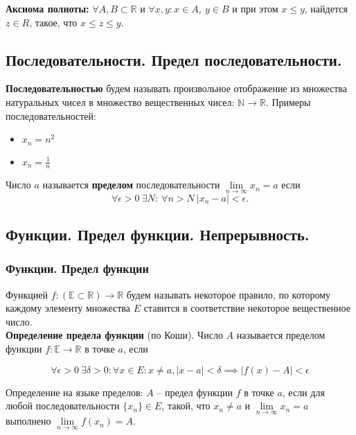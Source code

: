 \documentclass{article}
\begin{document}
\textbf{Аксиома полноты:} $\forall A, B \subset \mathbb{R}$ и $\forall x,y: x \in A, \ y \in B$ и при этом $x \le y$, найдется $z \in R$, такое, что $x \le z \le y$.

\subsection{Последовательности. Предел последовательности.}

\textbf{Последовательностью} будем называть произвольное отображение из множества натуральных чисел в множество вещественных чисел: $\mathbb{N} \to \mathbb{R}$. Примеры последовательностей:

\begin{itemize}
	\item $x_n = n^2$
	\item $x_n = \frac{1}{n}$
\end{itemize}

Число $a$ называется \textbf{пределом} последовательности $\lim\limits_{n \to \infty} x_n = a$ если $$ \forall \epsilon > 0 \ \exists N :  \ \forall n > N \ |x_n - a| < \epsilon.$$

\subsection{Функции. Предел функции. Непрерывность.}

\subsubsection{Функции. Предел функции}

Функцией $f : \left(\mathbb{E} \subset \mathbb{R}\right) \to \mathbb{R}$ будем называть некоторое правило, по которому каждому элементу множества $E$ ставится в соответствие некоторое вещественное число. \\

\textbf{Определение предела функции} (по Коши). Число $A$ называется пределом функции $f : \mathbb{E} \to \mathbb{R}$ в точке $a$, если 

$$ \forall \epsilon > 0 \ \exists \delta > 0 : \forall x \in E : x \ne a, |x - a| < \delta \implies |f(x) - A| < \epsilon $$

Определение на языке пределов: $A$ -- предел функции $f$ в точке $a$, если для любой последовательности $\{x_n\} \in E$, такой, что $x_n \ne a$ и $\lim\limits_{n \to \infty} x_n = a$ выполнено $\lim\limits_{n \to \infty} f(x_n) = A$.
\end{document}
